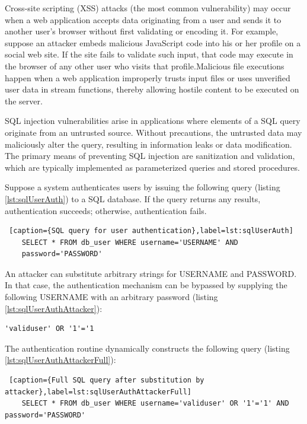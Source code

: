 Cross-site scripting (XSS) attacks (the most common vulnerability) \cite{ref_104_owasp:owasp} may occur when a web application accepts data originating
from a user and sends it to another user's browser without
first validating or encoding it. For example, suppose an attacker
embeds malicious JavaScript code into his or her profile on a
social web site. If the site fails to validate such input, that code
may execute in the browser of any other user who visits that
profile.Malicious file executions happen when a web application improperly trusts input files or uses unverified user data in stream functions, thereby allowing hostile content to be executed on the server.

SQL injection vulnerabilities arise in applications where elements of a SQL query originate from an untrusted source. Without precautions, the untrusted data may maliciously alter the query, resulting in information leaks or data modification. The primary means of preventing SQL injection are sanitization and validation, which are typically implemented as parameterized queries and stored procedures.

Suppose a system authenticates users by issuing the following query (listing \ref{lst:sqlUserAuth}) to a SQL database. If the query returns any results, authentication succeeds; otherwise, authentication fails.

\begin{lstlisting} [caption={SQL query for user authentication},label=lst:sqlUserAuth]
	SELECT * FROM db_user WHERE username='USERNAME' AND
	password='PASSWORD'
\end{lstlisting}

An attacker can substitute arbitrary strings for USERNAME and PASSWORD. In that case, the authentication mechanism can be bypassed by supplying the following USERNAME with an arbitrary password (listing \ref{lst:sqlUserAuthAttacker}):

\begin{lstlisting}[caption={SQL query after substitution by attacker},label=lst:sqlUserAuthAttacker]
	'validuser' OR '1'='1
\end{lstlisting}

The authentication routine dynamically constructs the following query (listing \ref{lst:sqlUserAuthAttackerFull}):

\begin{lstlisting} [caption={Full SQL query after substitution by attacker},label=lst:sqlUserAuthAttackerFull]
	SELECT * FROM db_user WHERE username='validuser' OR '1'='1' AND password='PASSWORD'
\end{lstlisting}

